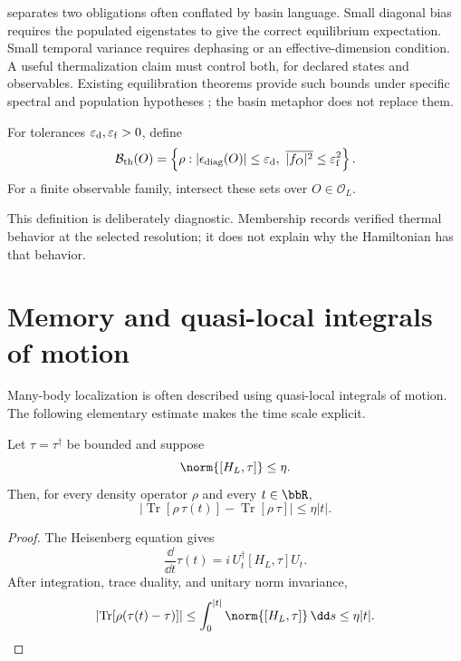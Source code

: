 \documentclass[11pt]{article}
\DeclareMathOperator{\Tr}{Tr}
\newcommand{\Obs}{\mathcal O}
\begin{document}
 separates two obligations often conflated by
basin language.  Small diagonal bias requires the populated eigenstates
to give the correct equilibrium expectation.  Small temporal variance
requires dephasing or an effective-dimension condition.  A useful
thermalization claim must control both, for declared states and
observables.  Existing equilibration theorems provide such bounds under
specific spectral and population hypotheses \cite{reimann2008}; the
basin metaphor does not replace them.

\begin{definition}\label{def:thermal-basin}
For tolerances $\varepsilon_{\rm d},\varepsilon_{\rm f}>0$, define
\[
\mathcal B_{\rm th}(O)=
\left\{\rho:
|\epsilon_{\rm diag}(O)|\leq\varepsilon_{\rm d},\
\overline{|f_O|^2}\leq\varepsilon_{\rm f}^2
\right\}.
\]
For a finite observable family, intersect these sets over $O\in\Obs_L$.
\end{definition}

This definition is deliberately diagnostic.  Membership records verified
thermal behavior at the selected resolution; it does not explain why the
Hamiltonian has that behavior.

\section{Memory and quasi-local integrals of motion}

Many-body localization is often described using quasi-local integrals of
motion.  The following elementary estimate makes the time scale explicit.

\begin{theorem}\label{thm:liom}
Let $\tau=\tau^\dagger$ be bounded and suppose
\[
 \norm{[H_L,\tau]}\leq\eta.
\]
Then, for every density operator $\rho$ and every $t\in\bbR$,
\begin{equation}\label{eq:liom}
 \left|\Tr[\rho\,\tau(t)]-\Tr[\rho\,\tau]\right|
 \leq \eta |t|.
\end{equation}
\end{theorem}

\begin{proof}
The Heisenberg equation gives
\[
\frac{\dd}{\dd t}\tau(t)=i\,U_t^\dagger[H_L,\tau]U_t.
\]
After integration, trace duality, and unitary norm invariance,
\[
\left|\Tr\!\left[\rho(\tau(t)-\tau)\right]\right|
\leq\int_0^{|t|}\norm{[H_L,\tau]}\,\dd s
\leq\eta|t|.
\]
\end{proof}
\end{document}
